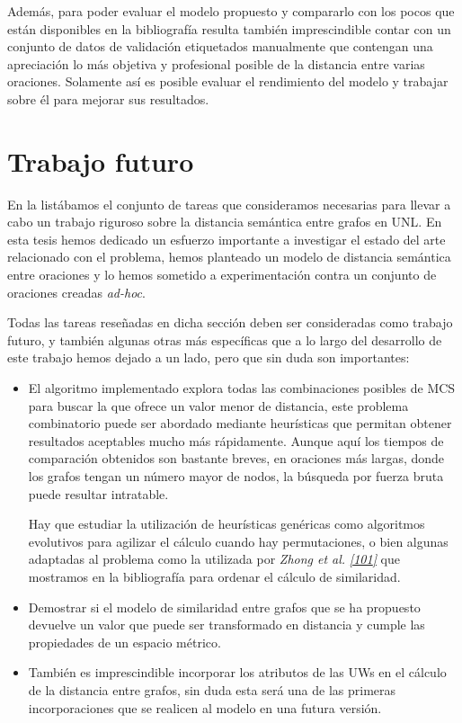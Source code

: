 \documentclass[a4paper,12pt,spanish]{book}
\begin{document}
Además, para poder evaluar el modelo propuesto y compararlo con los pocos que están
disponibles en la bibliografía resulta también imprescindible contar con un conjunto de
datos de validación etiquetados manualmente que contengan una apreciación lo más objetiva
y profesional posible de la distancia entre varias oraciones. Solamente así es posible
evaluar el rendimiento del modelo y trabajar sobre él para mejorar sus resultados.


\section{Trabajo futuro}
\label{6.conclusion/index:trabajo-futuro}
En la {\hyperref[2.problem/index:planteamiento-problema]{\emph{}}} listábamos el conjunto de tareas que
consideramos necesarias para llevar a cabo un trabajo riguroso sobre la distancia semántica
entre grafos en UNL. En esta tesis hemos dedicado un esfuerzo importante a investigar el estado
del arte relacionado con el problema, hemos planteado un modelo de distancia semántica
entre oraciones y lo hemos sometido a experimentación contra un conjunto de oraciones
creadas \emph{ad-hoc}.

Todas las tareas reseñadas en dicha sección deben ser consideradas como trabajo futuro, y
también algunas otras más específicas que a lo largo del desarrollo de este trabajo hemos
dejado a un lado, pero que sin duda son importantes:
\begin{itemize}
\item {} 
El algoritmo implementado explora todas las combinaciones posibles de MCS para buscar
la que ofrece un valor menor de distancia, este problema combinatorio puede ser
abordado mediante heurísticas que permitan obtener resultados aceptables mucho más
rápidamente. Aunque aquí los tiempos de comparación obtenidos son bastante breves,
en oraciones más largas, donde los grafos tengan un número mayor de nodos, la búsqueda
por fuerza bruta puede resultar intratable.

Hay que estudiar la utilización de heurísticas genéricas como algoritmos evolutivos
para agilizar el cálculo cuando hay permutaciones, o bien algunas adaptadas al
problema como la utilizada por \emph{Zhong et al.} \label{6.conclusion/index:id1}{\hyperref[zreferences:zhong2002]{\emph{{[}101{]}}}} que mostramos
en la bibliografía para ordenar el cálculo de similaridad.

\item {} 
Demostrar si el modelo de similaridad entre grafos que se ha propuesto devuelve un
valor que puede ser transformado en distancia y cumple las propiedades de un espacio
métrico.

\item {} 
También es imprescindible incorporar los atributos de las UWs en el cálculo de la
distancia entre grafos, sin duda esta será una de las primeras incorporaciones
que se realicen al modelo en una futura versión.

\end{itemize}
\end{document}
